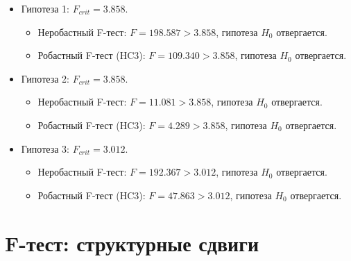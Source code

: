 \documentclass[
  russian,
]{article}
\providecommand{\tightlist}{%
  \setlength{\itemsep}{0pt}\setlength{\parskip}{0pt}}
\begin{document}
\begin{tcolorbox}[enhanced jigsaw, arc=.35mm, bottomrule=.15mm, bottomtitle=1mm, breakable, colback=white, colbacktitle=quarto-callout-tip-color!10!white, colframe=quarto-callout-tip-color-frame, coltitle=black, left=2mm, leftrule=.75mm, opacityback=0, opacitybacktitle=0.6, rightrule=.15mm, title=\textcolor{quarto-callout-tip-color}{\faLightbulb}\hspace{0.5em}{Критические значения и выводы}, titlerule=0mm, toprule=.15mm, toptitle=1mm]

\begin{itemize}
\tightlist
\item
  Гипотеза 1: \(F_{crit} = 3.858\).

  \begin{itemize}
  \tightlist
  \item
    Неробастный F-тест: \(F = 198.587 > 3.858\), гипотеза \(H_0\)
    отвергается.
  \item
    Робастный F-тест (HC3): \(F = 109.340 > 3.858\), гипотеза \(H_0\)
    отвергается.
  \end{itemize}
\item
  Гипотеза 2: \(F_{crit} = 3.858\).

  \begin{itemize}
  \tightlist
  \item
    Неробастный F-тест: \(F = 11.081 > 3.858\), гипотеза \(H_0\)
    отвергается.
  \item
    Робастный F-тест (HC3): \(F = 4.289 > 3.858\), гипотеза \(H_0\)
    отвергается.
  \end{itemize}
\item
  Гипотеза 3: \(F_{crit} = 3.012\).

  \begin{itemize}
  \tightlist
  \item
    Неробастный F-тест: \(F = 192.367 > 3.012\), гипотеза \(H_0\)
    отвергается.
  \item
    Робастный F-тест (HC3): \(F = 47.863 > 3.012\), гипотеза \(H_0\)
    отвергается.
  \end{itemize}
\end{itemize}

\end{tcolorbox}

\section{F-тест: структурные
сдвиги}\label{f-ux442ux435ux441ux442-ux441ux442ux440ux443ux43aux442ux443ux440ux43dux44bux435-ux441ux434ux432ux438ux433ux438}
\end{document}
